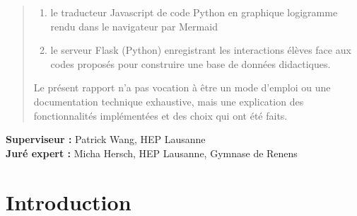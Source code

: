 \documentclass[11pt,a4paper]{article}
\begin{document}
\begin{titlepage}
\begin{abstract}
\begin{enumerate}
    \item le traducteur Javascript de code Python en graphique logigramme rendu dans le navigateur par Mermaid
    \item le serveur Flask (Python) enregistrant les interactions élèves face aux codes proposés pour construire une base de données didactiques. 
\end{enumerate}
\vspace{2cm}
Le présent rapport n'a pas vocation à être un mode d'emploi ou une documentation technique exhaustive, mais une explication des fonctionnalités implémentées et des choix qui ont été faits.
\vspace{2cm}

\end{abstract}

\textbf{Superviseur :} Patrick Wang, HEP Lausanne\\
\textbf{Juré expert :} Micha Hersch, HEP Lausanne, Gymnase de Renens

\end{titlepage}
\clearpage
\pagestyle{plain}

\tableofcontents
\listoffigures
\listoftables
\clearpage

\section{Introduction}
\end{document}
